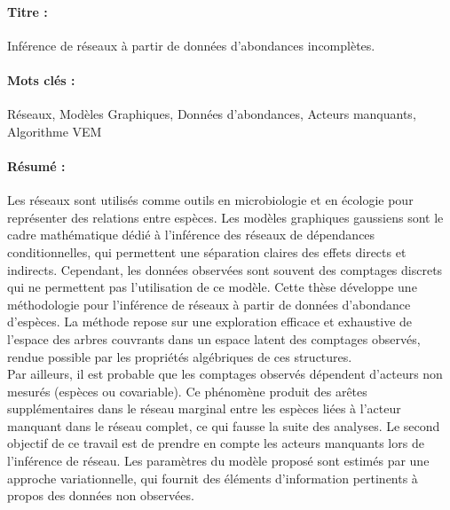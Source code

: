 \begin{mdframed}[linecolor=Prune,linewidth=1]
\vspace{-.25cm}
\paragraph*{Titre :} Inférence de réseaux à partir de données d'abondances incomplètes.
\begin{small}
\vspace{-.25cm}
\paragraph*{Mots clés :} Réseaux, Modèles Graphiques, Données d'abondances, Acteurs manquants, Algorithme VEM
\vspace{-.5cm}
\begin{multicols}{2}
\paragraph*{Résumé :}  

Les réseaux sont utilisés comme outils en microbiologie et en écologie pour représenter des relations entre espèces. Les modèles graphiques gaussiens sont le cadre mathématique dédié à l'inférence des réseaux de dépendances conditionnelles, qui permettent une séparation claires des effets directs et indirects. Cependant, les données observées sont souvent des comptages discrets qui ne permettent pas l'utilisation de ce modèle. Cette thèse développe une méthodologie pour l'inférence de réseaux à partir de données d'abondance d'espèces. La méthode repose sur une exploration efficace et exhaustive de l'espace des arbres couvrants dans un espace latent des comptages observés, rendue possible par les propriétés algébriques de ces structures.\\
Par ailleurs,  il est probable que les comptages observés dépendent d'acteurs non mesurés (espèces ou covariable).  Ce phénomène produit des arêtes supplémentaires dans le réseau marginal entre les espèces liées à l'acteur manquant dans le réseau complet, ce qui fausse la suite des analyses. Le second objectif de ce travail est de prendre en compte les acteurs manquants lors de l'inférence de réseau. Les paramètres du modèle proposé sont estimés par une approche variationnelle, qui fournit des éléments d'information pertinents à propos des données non observées.

\end{multicols}
\end{small}
\end{mdframed}

